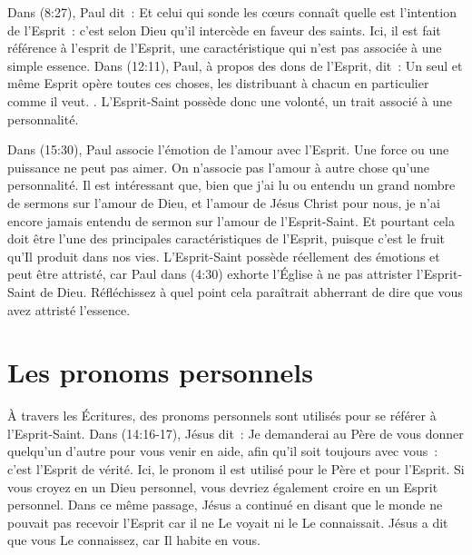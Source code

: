 Dans (8:27), Paul dit~: \og Et celui qui sonde les cœurs connaît quelle est l'intention de l'Esprit~: c'est selon Dieu qu'il intercède en faveur des saints. \fg{} Ici, il est fait référence à l'esprit  de l'Esprit, une caractéristique qui n'est pas associée à une simple essence. Dans (12:11), Paul, à propos des dons de l'Esprit, dit~: \og Un seul et même Esprit opère toutes ces choses, les distribuant à chacun en particulier comme il veut. \fg{}. L'Esprit-Saint possède donc une volonté, un trait associé à une personnalité.

Dans (15:30), Paul associe l'émotion de l'amour avec l'Esprit. Une force ou une puissance ne peut pas aimer. On n'associe pas l'amour à autre chose qu'une personnalité. Il est intéressant que, bien que j'ai lu ou entendu un grand nombre de sermons sur l'amour de Dieu, et l'amour de Jésus Christ pour nous, je n'ai encore jamais entendu de sermon sur l'amour de l'Esprit-Saint. Et pourtant cela doit être l'une des principales caractéristiques de l'Esprit, puisque c'est le fruit qu'Il produit dans nos vies. L'Esprit-Saint possède réellement des émotions et peut être attristé, car Paul dans (4:30) exhorte l'Église à ne pas attrister l'Esprit-Saint de Dieu. Réfléchissez à quel point cela paraîtrait abherrant de dire que vous avez attristé l'essence.


\section{Les pronoms personnels}

À travers les Écritures, des pronoms personnels sont utilisés pour se référer à l'Esprit-Saint. Dans (14:16-17), Jésus dit~: \og Je demanderai au Père de vous donner quelqu'un d'autre pour vous venir en aide, afin qu'il soit toujours avec vous~: c'est l'Esprit de vérité. \fg{} Ici, le pronom \og il \fg{} est utilisé pour le Père et pour l'Esprit. Si vous croyez en un Dieu personnel, vous devriez également croire en un Esprit personnel. Dans ce même passage, Jésus a continué en disant que le monde ne pouvait pas recevoir l'Esprit car il ne Le voyait ni le Le connaissait. Jésus a dit que vous Le connaissez, car Il habite en vous.

